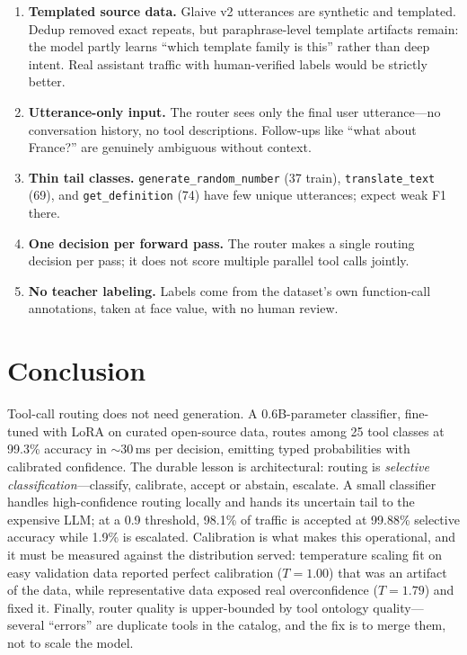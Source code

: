 \documentclass{article}
\begin{document}
\begin{enumerate}
  \item \textbf{Templated source data.} Glaive v2 utterances are synthetic and
  templated. Dedup removed exact repeats, but paraphrase-level template
  artifacts remain: the model partly learns ``which template family is this''
  rather than deep intent. Real assistant traffic with human-verified labels
  would be strictly better.
  \item \textbf{Utterance-only input.} The router sees only the final user
  utterance---no conversation history, no tool descriptions. Follow-ups like
  ``what about France?'' are genuinely ambiguous without context.
  \item \textbf{Thin tail classes.} \texttt{generate\_random\_number} (37
  train), \texttt{translate\_text} (69), and \texttt{get\_definition} (74)
  have few unique utterances; expect weak F1 there.
  \item \textbf{One decision per forward pass.} The router makes a single
  routing decision per pass; it does not score multiple parallel tool calls
  jointly.
  \item \textbf{No teacher labeling.} Labels come from the dataset's own
  function-call annotations, taken at face value, with no human review.
\end{enumerate}

\section{Conclusion}
\label{sec:conclusion}

Tool-call routing does not need generation. A 0.6B-parameter classifier,
fine-tuned with LoRA on curated open-source data, routes among 25 tool
classes at 99.3\% accuracy in $\sim$30\,ms per decision, emitting typed
probabilities with calibrated confidence. The durable lesson is
architectural: routing is \emph{selective classification}---classify,
calibrate, accept or abstain, escalate. A small classifier handles
high-confidence routing locally and hands its uncertain tail to the expensive
LLM; at a 0.9 threshold, 98.1\% of traffic is accepted at 99.88\% selective
accuracy while 1.9\% is escalated. Calibration is what makes this
operational, and it must be measured against the distribution served:
temperature scaling fit on easy validation data reported perfect calibration
($T=1.00$) that was an artifact of the data, while representative data
exposed real overconfidence ($T=1.79$) and fixed it. Finally, router quality
is upper-bounded by tool ontology quality---several ``errors'' are duplicate
tools in the catalog, and the fix is to merge them, not to scale the model.
\end{document}
